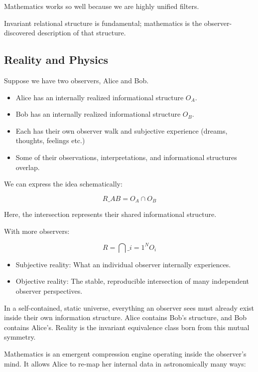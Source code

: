 Mathematics works so well because we are highly unified filters.

Invariant relational structure is fundamental; mathematics is the observer-discovered description of that structure.



\subsection*{Reality and Physics}

Suppose we have two observers, Alice and Bob.

\begin{itemize}
 \item Alice has an internally realized informational structure \(O_A\).
 \item Bob has an internally realized informational structure \(O_B\).
 \item Each has their own observer walk and subjective experience (dreams, thoughts, feelings etc.)
 \item Some of their observations, interpretations, and informational structures overlap.
\end{itemize}

We can express the idea schematically:

\[
R\_{AB}=O_A\cap O_B
\]

Here, the intersection represents their shared informational structure.

With more observers:

\[
R=\bigcap\_{i=1}^{N}O_i
\]


\begin{itemize}
\item Subjective reality: What an individual observer internally experiences.
\item Objective reality: The stable, reproducible intersection of many independent observer perspectives.
\end{itemize}



In a self-contained, static universe, everything an observer sees must already exist inside their own information structure. 
Alice contains Bob's structure, and Bob contains Alice's. Reality is the invariant equivalence class born from this mutual symmetry.

Mathematics is an emergent compression engine operating inside the observer's mind. It allows Alice to re-map her internal data in astronomically many ways:

